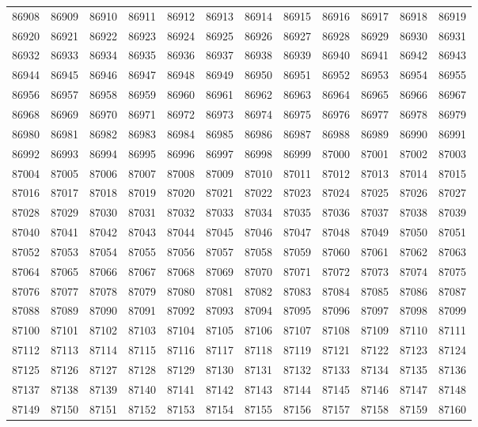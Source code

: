 \begin{center}
\begin{longtable}{llllllllllll}
86908 &86909 &86910 &86911 &86912 &86913 &86914 &86915 &86916 &86917 &86918 &86919 \\
86920 &86921 &86922 &86923 &86924 &86925 &86926 &86927 &86928 &86929 &86930 &86931 \\
86932 &86933 &86934 &86935 &86936 &86937 &86938 &86939 &86940 &86941 &86942 &86943 \\
86944 &86945 &86946 &86947 &86948 &86949 &86950 &86951 &86952 &86953 &86954 &86955 \\
86956 &86957 &86958 &86959 &86960 &86961 &86962 &86963 &86964 &86965 &86966 &86967 \\
86968 &86969 &86970 &86971 &86972 &86973 &86974 &86975 &86976 &86977 &86978 &86979 \\
86980 &86981 &86982 &86983 &86984 &86985 &86986 &86987 &86988 &86989 &86990 &86991 \\
86992 &86993 &86994 &86995 &86996 &86997 &86998 &86999 &87000 &87001 &87002 &87003 \\
87004 &87005 &87006 &87007 &87008 &87009 &87010 &87011 &87012 &87013 &87014 &87015 \\
87016 &87017 &87018 &87019 &87020 &87021 &87022 &87023 &87024 &87025 &87026 &87027 \\
87028 &87029 &87030 &87031 &87032 &87033 &87034 &87035 &87036 &87037 &87038 &87039 \\
87040 &87041 &87042 &87043 &87044 &87045 &87046 &87047 &87048 &87049 &87050 &87051 \\
87052 &87053 &87054 &87055 &87056 &87057 &87058 &87059 &87060 &87061 &87062 &87063 \\
87064 &87065 &87066 &87067 &87068 &87069 &87070 &87071 &87072 &87073 &87074 &87075 \\
87076 &87077 &87078 &87079 &87080 &87081 &87082 &87083 &87084 &87085 &87086 &87087 \\
87088 &87089 &87090 &87091 &87092 &87093 &87094 &87095 &87096 &87097 &87098 &87099 \\
87100 &87101 &87102 &87103 &87104 &87105 &87106 &87107 &87108 &87109 &87110 &87111 \\
87112 &87113 &87114 &87115 &87116 &87117 &87118 &87119 &87121 &87122 &87123 &87124 \\
87125 &87126 &87127 &87128 &87129 &87130 &87131 &87132 &87133 &87134 &87135 &87136 \\
87137 &87138 &87139 &87140 &87141 &87142 &87143 &87144 &87145 &87146 &87147 &87148 \\
87149 &87150 &87151 &87152 &87153 &87154 &87155 &87156 &87157 &87158 &87159 &87160 \\

\end{longtable}
\end{center}
